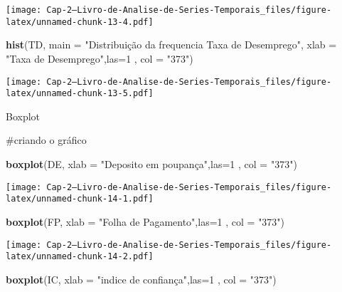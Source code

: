 \documentclass[]{article}
\newenvironment{Shaded}{\begin{snugshade}}{\end{snugshade}}
\newcommand{\DataTypeTok}[1]{\textcolor[rgb]{0.13,0.29,0.53}{#1}}
\newcommand{\DecValTok}[1]{\textcolor[rgb]{0.00,0.00,0.81}{#1}}
\newcommand{\KeywordTok}[1]{\textcolor[rgb]{0.13,0.29,0.53}{\textbf{#1}}}
\newcommand{\NormalTok}[1]{#1}
\newcommand{\StringTok}[1]{\textcolor[rgb]{0.31,0.60,0.02}{#1}}
\begin{document}
\texttt{[image: Cap-2---Livro-de-Analise-de-Series-Temporais\_files/figure-latex/unnamed-chunk-13-4.pdf]}

\begin{Shaded}
\begin{Highlighting}[]
\KeywordTok{hist}\NormalTok{(TD, }\DataTypeTok{main =} \StringTok{"Distribuição da frequencia Taxa de Desemprego"}\NormalTok{, }
     \DataTypeTok{xlab =} \StringTok{"Taxa de Desemprego"}\NormalTok{,}\DataTypeTok{las=}\DecValTok{1}\NormalTok{ , }\DataTypeTok{col =} \StringTok{"373"}\NormalTok{)}
\end{Highlighting}
\end{Shaded}

\texttt{[image: Cap-2---Livro-de-Analise-de-Series-Temporais\_files/figure-latex/unnamed-chunk-13-5.pdf]}

Boxplot

\#criando o gráfico

\begin{Shaded}
\begin{Highlighting}[]
\KeywordTok{boxplot}\NormalTok{(DE,}
         \DataTypeTok{xlab =} \StringTok{"Deposito em poupança"}\NormalTok{,}\DataTypeTok{las=}\DecValTok{1}\NormalTok{ , }\DataTypeTok{col =} \StringTok{"373"}\NormalTok{)}
\end{Highlighting}
\end{Shaded}

\texttt{[image: Cap-2---Livro-de-Analise-de-Series-Temporais\_files/figure-latex/unnamed-chunk-14-1.pdf]}

\begin{Shaded}
\begin{Highlighting}[]
\KeywordTok{boxplot}\NormalTok{(FP,}
         \DataTypeTok{xlab =} \StringTok{"Folha de Pagamento"}\NormalTok{,}\DataTypeTok{las=}\DecValTok{1}\NormalTok{ , }\DataTypeTok{col =} \StringTok{"373"}\NormalTok{)}
\end{Highlighting}
\end{Shaded}

\texttt{[image: Cap-2---Livro-de-Analise-de-Series-Temporais\_files/figure-latex/unnamed-chunk-14-2.pdf]}

\begin{Shaded}
\begin{Highlighting}[]
\KeywordTok{boxplot}\NormalTok{(IC,}
         \DataTypeTok{xlab =} \StringTok{"indice de confiança"}\NormalTok{,}\DataTypeTok{las=}\DecValTok{1}\NormalTok{ , }\DataTypeTok{col =} \StringTok{"373"}\NormalTok{)}
\end{Highlighting}
\end{Shaded}
\end{document}

